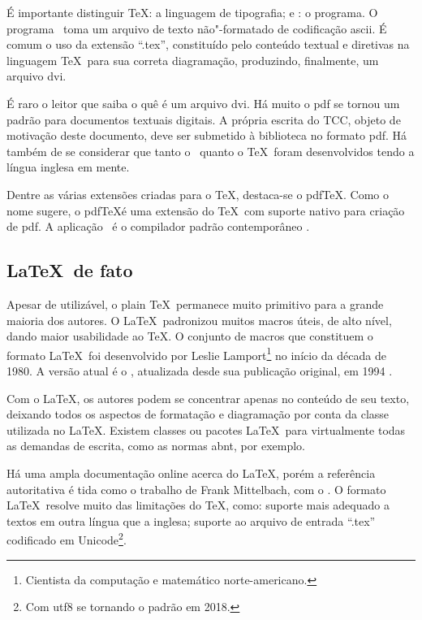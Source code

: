 É importante distinguir \TeX: a linguagem de tipografia; e \tex: o programa. O programa \tex\ toma um arquivo de texto não"-formatado de codificação \ac{ascii}. É comum o uso da extensão \enquote{.tex}, constituído pelo conteúdo textual e diretivas na linguagem \TeX\ para sua correta diagramação, produzindo, finalmente, um arquivo \ac{dvi}.

É raro o leitor que saiba o quê é um arquivo \ac{dvi}. Há muito o \ac{pdf} se tornou um padrão  para documentos textuais digitais. A própria escrita do TCC, objeto de motivação deste documento, deve ser submetido à biblioteca no formato \ac{pdf}. Há também de se considerar que tanto o \tex\ quanto o \TeX\ foram desenvolvidos tendo a língua inglesa em mente.

Dentre as várias extensões criadas para o \TeX, destaca-se o pdf\TeX. Como o nome sugere, o pdf\TeX é uma extensão do \TeX\ com suporte nativo para criação de \ac{pdf}. A aplicação \pdftex\ é o compilador padrão contemporâneo \cite{Thanh2024}.

\subsection{\LaTeX\ de fato}

Apesar de utilizável, o plain \TeX\ permanece muito primitivo para a grande maioria dos autores. O \LaTeX\ padronizou muitos macros úteis, de alto nível, dando maior usabilidade ao \TeX. O conjunto de macros que constituem o formato \LaTeX\ foi desenvolvido por Leslie Lamport\footnote{Cientista da computação e matemático norte-americano.} no início da década de 1980. A versão atual é o \LaTeXe, atualizada desde sua publicação original, em 1994 \cite{Lamport1994}.

Com o \LaTeX, os autores podem se concentrar apenas no conteúdo de seu texto, deixando todos os aspectos de formatação e diagramação por conta da classe utilizada no \LaTeX. Existem classes ou pacotes \LaTeX\ para virtualmente todas as demandas de escrita, como as normas \ac{abnt}, por exemplo.

Há uma ampla documentação online acerca do \LaTeX, porém a referência autoritativa é tida como o trabalho de Frank Mittelbach, com o  \cite{Mittelbach2023}. O formato \LaTeX\ resolve muito das limitações do \TeX, como: suporte mais adequado a textos em outra língua que a inglesa; suporte ao arquivo de entrada \enquote{.tex} codificado em Unicode\footnote{Com \ac{utf8} se tornando o padrão em 2018.}.

